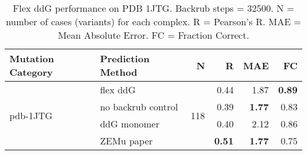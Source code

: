 \begin{table}
  \begin{tabular}{llrrrr}
\toprule
Mutation Category &   Prediction Method &    N &    R &  MAE &   FC \\
\midrule
 \multirow{ 4}{*}{pdb-1JTG} & flex ddG & \multirow{ 4}{*}{118} & 0.44 & 1.87 & \textbf{0.89}  \\
 & no backrub control & & 0.39 & \textbf{1.77} & 0.83  \\
 & ddG monomer & & 0.40 & 2.12 & 0.86  \\
 & ZEMu paper & & \textbf{0.51} & \textbf{1.77} & 0.75  \\
\bottomrule
\end{tabular}
  \caption[Flex ddG performance on PDB 1JTG]{
    Flex ddG performance on PDB 1JTG. Backrub steps = 32500. N = number of cases (variants) for each complex. R = Pearson's R. MAE = Mean Absolute Error. FC = Fraction Correct.
  } \label{tab:table-pdb-1JTG}
\end{table}
